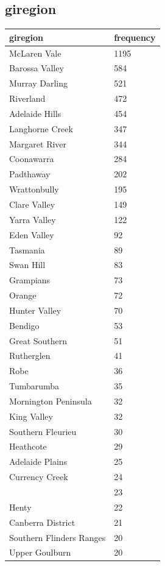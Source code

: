 \documentclass[review,12pt,authoryear]{elsarticle}
\begin{document}
\begin{linenumbers}
\subsection{giregion}
\begin{table}[]
  \begin{tabular}{@{}ll@{}}
  \toprule
  giregion & frequency \\ \midrule
  McLaren Vale & 1195 \\
  Barossa Valley & 584 \\
  Murray Darling & 521 \\
  Riverland & 472 \\
  Adelaide Hills & 454 \\
  Langhorne Creek & 347 \\
  Margaret River & 344 \\
  Coonawarra & 284 \\
  Padthaway & 202 \\
  Wrattonbully & 195 \\
  Clare Valley & 149 \\
  Yarra Valley & 122 \\
  Eden Valley & 92 \\
  Tasmania & 89 \\
  Swan Hill & 83 \\
  Grampians & 73 \\
  Orange & 72 \\
  Hunter Valley & 70 \\
  Bendigo & 53 \\
  Great Southern & 51 \\
  Rutherglen & 41 \\
  Robe & 36 \\
  Tumbarumba & 35 \\
  Mornington Peninsula & 32 \\
  King Valley & 32 \\
  Southern Fleurieu & 30 \\
  Heathcote & 29 \\
  Adelaide Plains & 25 \\
  Currency Creek & 24 \\
   & 23 \\
  Henty & 22 \\
  Canberra District & 21 \\
  Southern Flinders Ranges & 20 \\
  Upper Goulburn & 20 \\

\end{tabular}
\end{table}
\end{linenumbers}
\end{document}
